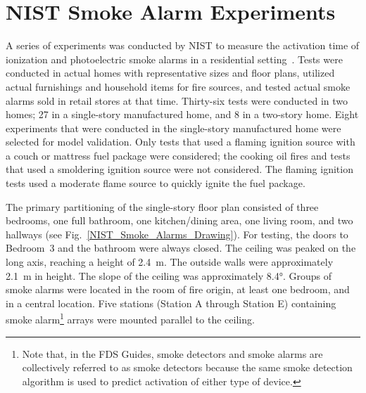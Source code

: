 \section{NIST Smoke Alarm Experiments}
\label{NIST_Smoke_Alarm_Description}

A series of experiments was conducted by NIST to measure the activation time of ionization and photoelectric smoke alarms in a residential setting~\cite{Bukowski:1}. Tests were conducted in actual homes with representative sizes and floor plans, utilized actual furnishings and household items for fire sources, and tested actual smoke alarms sold in retail stores at that time. Thirty-six tests were conducted in two homes; 27 in a single-story manufactured home, and 8 in a two-story home. Eight experiments that were conducted in the single-story manufactured home were selected for model validation. Only tests that used a flaming ignition source with a couch or mattress fuel package were considered; the cooking oil fires and tests that used a smoldering ignition source were not considered. The flaming ignition tests used a moderate flame source to quickly ignite the fuel package.

The primary partitioning of the single-story floor plan consisted of three bedrooms, one full bathroom, one kitchen/dining area, one living room, and two hallways (see Fig.~\ref{NIST_Smoke_Alarms_Drawing}). For testing, the doors to Bedroom~3 and the bathroom were always closed. The ceiling was peaked on the long axis, reaching a height of 2.4~m. The outside walls were approximately 2.1~m in height. The slope of the ceiling was approximately 8.4\unit{\degree}. Groups of smoke alarms were located in the room of fire origin, at least one bedroom, and in a central location. Five stations (Station A through Station E) containing smoke alarm\footnote{Note that, in the FDS Guides, smoke detectors and smoke alarms are collectively referred to as smoke detectors because the same smoke detection algorithm is used to predict activation of either type of device.} arrays were mounted parallel to the ceiling.

